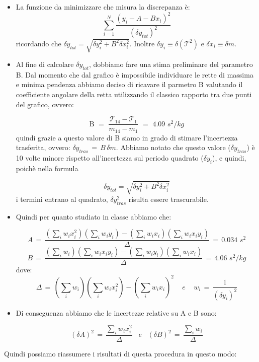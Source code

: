 \begin{itemize}
\item{La funzione da minimizzare che misura la discrepanza è:
		\begin{equation*}
            \sum_{i=1}^{N} \frac{(y_i - A - Bx_i)^2}{(\delta y_{tot})^2}
		\end{equation*}
    ricordando che $\delta y_{tot} = \sqrt{\delta y_i^2 + B^2\delta x_i^2}$. Inoltre $\delta y_i \equiv \delta (\mathcal{T}^2)$
    e $\delta x_i \equiv \delta m$.}

\item{Al fine di calcolare $\delta y_{tot}$, dobbiamo fare una stima preliminare del parametro B. Dal momento che dal grafico è impossibile individuare le rette di massima e minima pendenza abbiamo deciso di ricavare il parmetro B valutando il coefficiente angolare della retta utilizzando il classico rapporto tra due punti del grafico, ovvero:

	\begin{equation*}
		\text{B} \,\,=\,\, \frac{\mathcal{T}_{14} - \mathcal{T}_{1}}{m_{14} - m_1} \,\,=\,\, 4.09 \,\, s^2/kg
	\end{equation*}
    quindi grazie a questo valore di B siamo in grado di stimare l'incertezza trasferita, ovvero:
    $\delta y_{tras} \,=\, B \, \delta m$. Abbiamo notato che questo valore ($\delta y_{tras}$) è 10
    volte minore rispetto all'incertezza sul periodo quadrato ($\delta y_i$), e quindi, poichè nella formula
	
	\begin{equation*}
		\delta y_{tot} = \sqrt{\delta y_i^2 + B^2\delta x_i^2}
	\end{equation*}	
	i termini entrano al quadrato, $\delta y_{tras}^2$ risulta essere trascurabile.
	}
\item{Quindi per quanto studiato in classe abbiamo che:

		\begin{equation*}
			A \,=\, \frac{(\sum_i w_i x_i^2)(\sum_i w_i y_i) - (\sum_i w_i x_i)(\sum_i w_i x_i y_i)}{\Delta} \,=\, 0.034 \,\, s^2
		\end{equation*}
		\begin{equation*}
			B \,=\, \frac{(\sum_i w_i)(\sum_i w_i x_i y_i) - (\sum_i w_i y_i)(\sum_i w_i x_i)}{\Delta} \,=\, 4.06 \,\, s^2 / kg
		\end{equation*}
		dove:
		\begin{equation*}
			\Delta \,=\, (\sum_i w_i)(\sum_i w_i x_i^2) - (\sum_i w_i x_i)^2 \,\,\,\,\,\,\, e \,\,\,\,\,\,\,
			w_i \,=\, \frac{1}{(\delta y_i)^2}
		\end{equation*}}
\item{Di conseguenza abbiamo che le incertezze relative su A e B sono:

		\begin{equation*}
			(\delta A)^2 \,=\, \frac{\sum_i w_i x_i^2}{\Delta}  \,\,\,\,\, e \,\,\,\,\,
			(\delta B)^2 \,=\, \frac{\sum_i w_i}{\Delta} 
		\end{equation*}}
\end{itemize} 
Quindi possiamo riassumere i risultati di questa procedura in questo modo:

